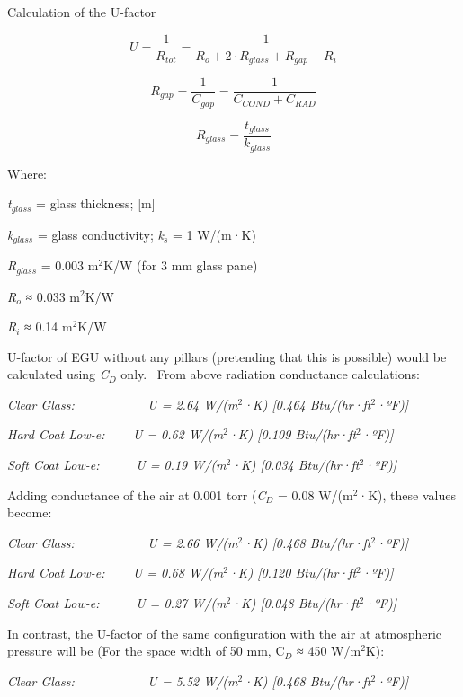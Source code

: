 Calculation of the U-factor

\begin{equation}
U = \frac{1}{{{R_{tot}}}} = \frac{1}{{{R_o} + 2 \cdot {R_{glass}} + {R_{gap}} + {R_i}}}
\end{equation}

\begin{equation}
{R_{gap}} = \frac{1}{{{C_{gap}}}} = \frac{1}{{{C_{COND}} + {C_{RAD}}}}
\end{equation}

\begin{equation}
{R_{glass}} = \frac{{{t_{glass}}}}{{{k_{glass}}}}
\end{equation}

Where:

\emph{t}\(_{glass}\) = glass thickness; {[}m{]}

\emph{k}\(_{glass}\) = glass conductivity; \emph{k}\(_{s}\) = 1 W/(m·K)

\emph{R}\(_{glass}\) = 0.003 m\(^{2}\)K/W (for 3 mm glass pane)

\emph{R}\(_{o}\) ≈ 0.033 m\(^{2}\)K/W

\emph{R}\(_{i}\) ≈ 0.14 m\(^{2}\)K/W

U-factor of EGU without any pillars (pretending that this is possible) would be calculated using \emph{C}\(_{D}\) only.~ From above radiation conductance calculations:

\emph{Clear Glass: ~~~~~~~~~~ U = 2.64 W/(m\(^{2}\)·K) {[}0.464 Btu/(hr·ft\(^{2}\)·ºF){]}}

\emph{Hard Coat Low-e: ~~~ U = 0.62 W/(m\(^{2}\)·K) {[}0.109 Btu/(hr·ft\(^{2}\)·ºF){]}}

\emph{Soft Coat Low-e:~~~~~ U = 0.19 W/(m\(^{2}\)·K) {[}0.034 Btu/(hr·ft\(^{2}\)·ºF){]}}

Adding conductance of the air at 0.001 torr (\emph{C}\(_{D}\) = 0.08 W/(m\(^{2}\)·K), these values become:

\emph{Clear Glass: ~~~~~~~~~~ U = 2.66 W/(m\(^{2}\)·K) {[}0.468 Btu/(hr·ft\(^{2}\)·ºF){]}}

\emph{Hard Coat Low-e: ~~~ U = 0.68 W/(m\(^{2}\)·K) {[}0.120 Btu/(hr·ft\(^{2}\)·ºF){]}}

\emph{Soft Coat Low-e:~~~~~ U = 0.27 W/(m\(^{2}\)·K) {[}0.048 Btu/(hr·ft\(^{2}\)·ºF){]}}

In contrast, the U-factor of the same configuration with the air at atmospheric pressure will be (For the space width of 50 mm, C\(_{D}\) ≈ 450 W/m\(^{2}\)K):

\emph{Clear Glass: ~~~~~~~~~~ U = 5.52 W/(m\(^{2}\)·K) {[}0.468 Btu/(hr·ft\(^{2}\)·ºF){]}}


